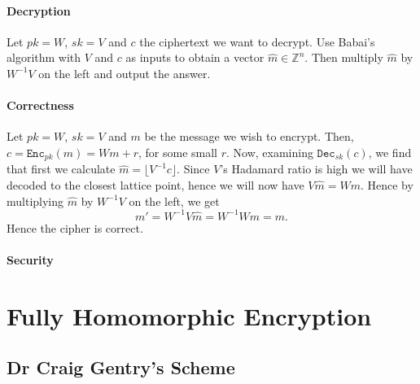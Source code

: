 \documentclass{article}
\theoremstyle{definition}
\newcommand{\Enc}{\texttt{Enc}}
\newcommand{\Dec}{\texttt{Dec}}
\newcommand{\Int}{\mathbb{Z}}
\begin{document}
\paragraph{Decryption}
Let $pk = W$, $sk = V$ and $c$ the ciphertext we want to decrypt. Use Babai's
algorithm with $V$ and $c$ as inputs to obtain a vector $\hat{m} \in \Int^n$. Then multiply
$\hat{m}$ by $W^{-1}V$ on the left and output the answer.
\paragraph{Correctness}
Let $pk = W$, $sk = V$ and $m$ be the message we wish to encrypt. Then, $c =
\Enc_{pk}(m) = Wm + r$, for some small $r$. Now, examining $\Dec_{sk}(c)$, we
find that first we calculate $\hat{m} = \lfloor V^{-1}c \rfloor$. Since $V$'s
Hadamard ratio is high we will have decoded to the closest lattice point, hence
we will now have $V\hat{m} = Wm$. Hence by multiplying $\hat{m}$ by $W^{-1}V$ on
the left, we get
\[
  m' = W^{-1}V\hat{m} = W^{-1}Wm = m.
\]
Hence the cipher is correct.
\paragraph{Security}
\section{Fully Homomorphic Encryption}
\subsection{Dr Craig Gentry's Scheme}

\printbibliography
\end{document}
